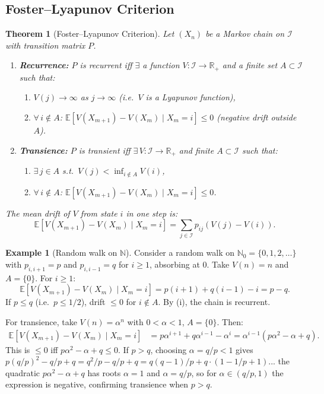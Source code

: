 \documentclass[12pt, a4paper]{article}
\theoremstyle{definition}
\newtheorem{example}{Example}[section]
\theoremstyle{plain}
\newtheorem{theorem}{Theorem}[section]
\newcommand{\EE}{\mathbb{E}}
\newcommand{\II}{\mathcal{I}}
\newcommand{\RR}{\mathbb{R}}
\newcommand{\NN}{\mathbb{N}}
\begin{document}
\subsection{Foster--Lyapunov Criterion}

\begin{theorem}[Foster--Lyapunov Criterion]
\label{thm:foster-lyapunov}
Let $(X_n)$ be a Markov chain on $\II$ with transition matrix $P$.
\begin{enumerate}[label=(\roman*)]
  \item \textbf{Recurrence:} $P$ is recurrent iff $\exists$ a function $V : \II \to \RR_+$ and a finite set $A \subset \II$ such that:
  \begin{enumerate}[label=(\alph*)]
    \item $V(j) \to \infty$ as $j \to \infty$ (i.e.\ $V$ is a Lyapunov function),
    \item $\forall\, i \notin A$: $\EE[V(X_{m+1}) - V(X_m) \mid X_m = i] \le 0$ (negative drift outside $A$).
  \end{enumerate}
  \item \textbf{Transience:} $P$ is transient iff $\exists\, V : \II \to \RR_+$ and finite $A \subset \II$ such that:
  \begin{enumerate}[label=(\alph*)]
    \item $\exists\, j \in A$ s.t.\ $V(j) < \inf_{i \notin A} V(i)$,
    \item $\forall\, i \notin A$: $\EE[V(X_{m+1}) - V(X_m) \mid X_m = i] \le 0$.
  \end{enumerate}
\end{enumerate}

The \emph{mean drift} of $V$ from state $i$ in one step is:
\begin{equation*}
  \EE[V(X_{m+1}) - V(X_m) \mid X_m = i] = \sum_{j \in \II} p_{ij}(V(j) - V(i)).
\end{equation*}
\end{theorem}

\begin{example}[Random walk on $\NN$]
Consider a random walk on $\NN_0 = \{0, 1, 2, \ldots\}$ with $p_{i,i+1} = p$ and $p_{i,i-1} = q$ for $i \ge 1$, absorbing at 0. Take $V(n) = n$ and $A = \{0\}$. For $i \ge 1$:
\begin{equation*}
  \EE[V(X_{m+1}) - V(X_m) \mid X_m = i] = p(i+1) + q(i-1) - i = p - q.
\end{equation*}
If $p \le q$ (i.e.\ $p \le 1/2$), drift $\le 0$ for $i \notin A$. By (i), the chain is recurrent.

For transience, take $V(n) = \alpha^n$ with $0 < \alpha < 1$, $A = \{0\}$. Then:
\begin{align*}
  \EE[V(X_{m+1})-V(X_m)\mid X_m=i] &= p\alpha^{i+1} + q\alpha^{i-1} - \alpha^i = \alpha^{i-1}(p\alpha^2 - \alpha + q).
\end{align*}
This is $\le 0$ iff $p\alpha^2 - \alpha + q \le 0$. If $p > q$, choosing $\alpha = q/p < 1$ gives $p(q/p)^2 - q/p + q = q^2/p - q/p + q = q(q-1)/p + q \cdot(1 - 1/p + 1) $... the quadratic $p\alpha^2 - \alpha + q$ has roots $\alpha = 1$ and $\alpha = q/p$, so for $\alpha \in (q/p, 1)$ the expression is negative, confirming transience when $p > q$.
\end{example}
\end{document}

